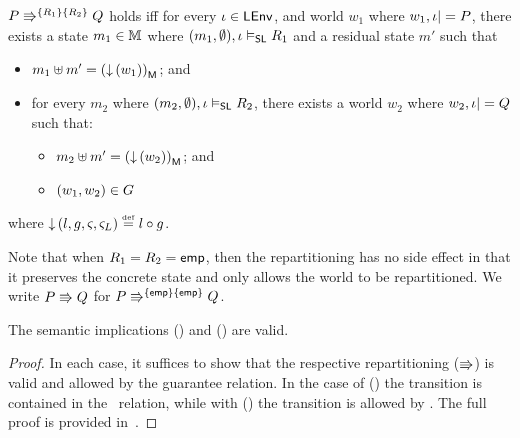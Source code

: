 \begin{definition}[Repartitioning] \label{def:repartitioning}
$\repartitions{P}{Q}{R_1}{R_2}$ holds iff for every $\lenv \in \LEnv$, and world $w_1$ where $w_1, \lenv |= P$, there exists a state $m_1 \in \Heaps$ where $(m_1, \emptyset), \lenv \slsat R_1$ and a residual state $m'$ such that 
%
\begin{itemize} 
	\item $m_1 \composeH m' = \heapPart{\left(\collapseW{w_1}\right)}$; and
	\item for every $m_2$ where $(m_2, \emptyset), \lenv \slsat R_2$, there exists a world $w_2$ where $w_2, \lenv |= Q$ such that:
	\begin{itemize}
		\item $m_2 \composeH m' = \heapPart{\left(\collapseW{w_2}\right)}$; and
		\item $(w_1, w_2) \in \guarantee$
	\end{itemize}	  
\end{itemize}
%
where $\collapseW{l, g, \amod{}, \amod{L}} \eqdef l \composeL g$.

Note that when $R_1 = R_2 = \emp$, then the repartitioning has no side effect in that it preserves the concrete state and only allows the world to be repartitioned. We write $P \semimplies Q$ for $\repartitions{P}{Q}{\emp}{\emp} $.
%	
\end{definition}
%
%
\begin{lemma}[]
The semantic implications (\extendRule) and (\shiftRule) are valid.
%
\begin{proof}
In each case, it suffices to show that the respective repartitioning ($\semimplies$) is valid and allowed by the guarantee relation. In the case of (\extendRule) the transition is contained in the \extendG\ relation, while with (\shiftRule) the transition is allowed by \shiftG. The full proof is provided in~\cite{colosl-tr14}.
\renewcommand{\qed}{}
\end{proof}
%
\end{lemma}
%
%
